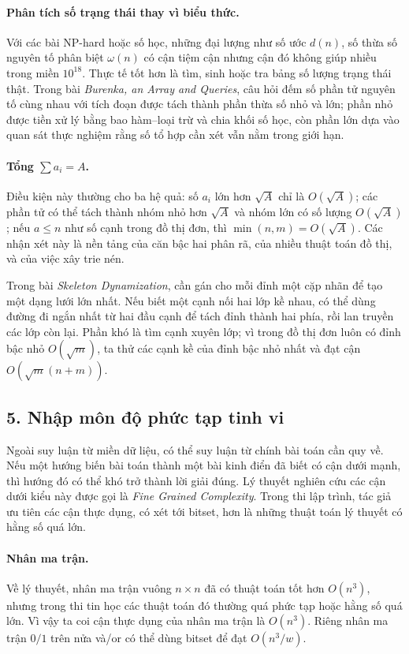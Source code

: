 \documentclass[11pt]{article}
\begin{document}
\paragraph{Phân tích số trạng thái thay vì biểu thức.}
Với các bài NP-hard hoặc số học, những đại lượng như số ước \(d(n)\), số thừa
số nguyên tố phân biệt \(\omega(n)\) có cận tiệm cận nhưng cận đó không giúp
nhiều trong miền \(10^{18}\). Thực tế tốt hơn là tìm, sinh hoặc tra bảng số
lượng trạng thái thật. Trong bài \emph{Burenka, an Array and Queries}, câu hỏi
đếm số phần tử nguyên tố cùng nhau với tích đoạn được tách thành phần thừa số
nhỏ và lớn; phần nhỏ được tiền xử lý bằng bao hàm--loại trừ và chia khối số
học, còn phần lớn dựa vào quan sát thực nghiệm rằng số tổ hợp cần xét vẫn nằm
trong giới hạn.

\paragraph{Tổng \(\sum a_i=A\).}
Điều kiện này thường cho ba hệ quả: số \(a_i\) lớn hơn \(\sqrt A\) chỉ là
\(O(\sqrt A)\); các phần tử có thể tách thành nhóm nhỏ hơn \(\sqrt A\) và nhóm
lớn có số lượng \(O(\sqrt A)\); nếu \(a\le n\) như số cạnh trong đồ thị đơn,
thì \(\min(n,m)=O(\sqrt A)\). Các nhận xét này là nền tảng của căn bậc hai
phân rã, của nhiều thuật toán đồ thị, và của việc xây trie nén.

Trong bài \emph{Skeleton Dynamization}, cần gán cho mỗi đỉnh một cặp nhãn để
tạo một dạng lưới lớn nhất. Nếu biết một cạnh nối hai lớp kề nhau, có thể dùng
đường đi ngắn nhất từ hai đầu cạnh để tách đỉnh thành hai phía, rồi lan truyền
các lớp còn lại. Phần khó là tìm cạnh xuyên lớp; vì trong đồ thị đơn luôn có
đỉnh bậc nhỏ \(O(\sqrt m)\), ta thử các cạnh kề của đỉnh bậc nhỏ nhất và đạt
cận \(O(\sqrt m(n+m))\).

\subsection*{5. Nhập môn độ phức tạp tinh vi}

Ngoài suy luận từ miền dữ liệu, có thể suy luận từ chính bài toán cần quy về.
Nếu một hướng biến bài toán thành một bài kinh điển đã biết có cận dưới mạnh,
thì hướng đó có thể khó trở thành lời giải đúng. Lý thuyết nghiên cứu các cận
dưới kiểu này được gọi là \emph{Fine Grained Complexity}. Trong thi lập trình,
tác giả ưu tiên các cận thực dụng, có xét tới bitset, hơn là những thuật toán
lý thuyết có hằng số quá lớn.

\paragraph{Nhân ma trận.}
Về lý thuyết, nhân ma trận vuông \(n\times n\) đã có thuật toán tốt hơn
\(O(n^3)\), nhưng trong thi tin học các thuật toán đó thường quá phức tạp hoặc
hằng số quá lớn. Vì vậy ta coi cận thực dụng của nhân ma trận là \(O(n^3)\).
Riêng nhân ma trận \(0/1\) trên nửa và/or có thể dùng bitset để đạt
\(O(n^3/w)\).
\end{document}
